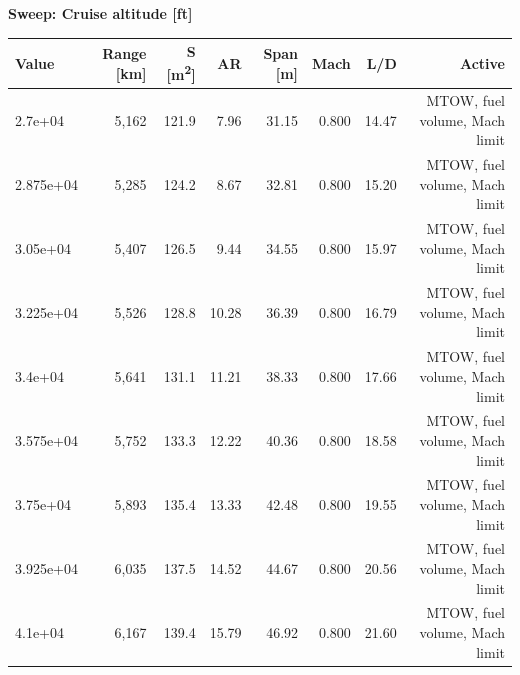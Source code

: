 \documentclass[10pt,a4paper]{article}
\begin{document}
\begin{table}[H]\centering\small
{\textbf{Sweep: Cruise altitude [ft]}}\\[3pt]
\begin{tabular}{lrrrrrrr}
\toprule
\textbf{Value} & \textbf{Range [km]} & \textbf{S [m\textsuperscript{2}]} & \textbf{AR} & \textbf{Span [m]} & \textbf{Mach} & \textbf{L/D} & \textbf{Active} \\
\midrule
2.7e+04 & 5,162 & 121.9 & 7.96 & 31.15 & 0.800 & 14.47 & MTOW, fuel volume, Mach limit \\
2.875e+04 & 5,285 & 124.2 & 8.67 & 32.81 & 0.800 & 15.20 & MTOW, fuel volume, Mach limit \\
3.05e+04 & 5,407 & 126.5 & 9.44 & 34.55 & 0.800 & 15.97 & MTOW, fuel volume, Mach limit \\
3.225e+04 & 5,526 & 128.8 & 10.28 & 36.39 & 0.800 & 16.79 & MTOW, fuel volume, Mach limit \\
3.4e+04 & 5,641 & 131.1 & 11.21 & 38.33 & 0.800 & 17.66 & MTOW, fuel volume, Mach limit \\
3.575e+04 & 5,752 & 133.3 & 12.22 & 40.36 & 0.800 & 18.58 & MTOW, fuel volume, Mach limit \\
3.75e+04 & 5,893 & 135.4 & 13.33 & 42.48 & 0.800 & 19.55 & MTOW, fuel volume, Mach limit \\
3.925e+04 & 6,035 & 137.5 & 14.52 & 44.67 & 0.800 & 20.56 & MTOW, fuel volume, Mach limit \\
4.1e+04 & 6,167 & 139.4 & 15.79 & 46.92 & 0.800 & 21.60 & MTOW, fuel volume, Mach limit \\
\bottomrule
\end{tabular}
\end{table}
\end{document}

